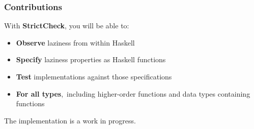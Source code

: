 \documentclass{beamer}
\begin{document}

\begin{frame}[fragile]
\frametitle{Contributions}
With \textbf{StrictCheck}, you will be able to:
\begin{itemize}
\item \textbf{Observe} laziness from within Haskell
\item \textbf{Specify} laziness properties as Haskell functions
\item \textbf{Test} implementations against those specifications
\item \textbf{For all types},\footnotemark\, including higher-order functions and
      data types containing functions
\end{itemize}
The implementation is a work in progress.
\end{frame}
\end{document}
